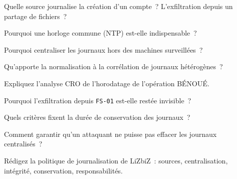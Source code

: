 \bigskip

\begin{boxexo}[title={\ding{45}\quad Exercice~4.1. Sources \niveaubase}]
Quelle source journalise la création d'un compte~? L'exfiltration depuis un
partage de fichiers~?
\end{boxexo}

\begin{boxexo}[title={\ding{45}\quad Exercice~4.2. Horloge \niveaubase}]
Pourquoi une horloge commune (NTP) est-elle indispensable~?
\end{boxexo}

\begin{boxexo}[title={\ding{45}\quad Exercice~4.3. Centraliser \niveaubase}]
Pourquoi centraliser les journaux hors des machines surveillées~?
\end{boxexo}

\begin{boxexo}[title={\ding{45}\quad Exercice~4.4. Normaliser \niveaumoyen}]
Qu'apporte la normalisation à la corrélation de journaux hétérogènes~?
\end{boxexo}

\begin{boxexo}[title={\ding{45}\quad Exercice~4.5. CRO \niveaumoyen}]
Expliquez l'analyse CRO de l'horodatage de l'opération BÉNOUÉ.
\end{boxexo}

\begin{boxexo}[title={\ding{45}\quad Exercice~4.6. Angle mort \niveaumoyen}]
Pourquoi l'exfiltration depuis \texttt{FS-01} est-elle restée invisible~?
\end{boxexo}

\begin{boxexo}[title={\ding{45}\quad Exercice~4.7. Conservation \niveaumoyen}]
Quels critères fixent la durée de conservation des journaux~?
\end{boxexo}

\begin{boxexo}[title={\ding{45}\quad Exercice~4.8. Intégrité \niveaumoyen}]
Comment garantir qu'un attaquant ne puisse pas effacer les journaux
centralisés~?
\end{boxexo}

\begin{boxexo}[title={\ding{45}\quad Exercice~4.9. Politique \niveauexpert}]
Rédigez la politique de journalisation de LiZbiZ~: sources, centralisation,
intégrité, conservation, responsabilités.
\end{boxexo}

